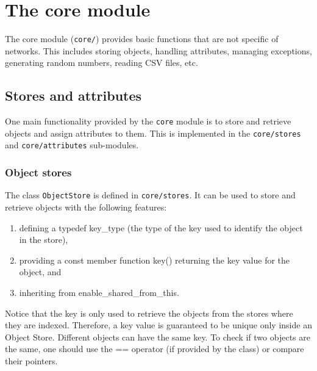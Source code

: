 \chapter{The core module}

The core module (\texttt{core/}) provides basic functions that are not specific of networks. This includes storing objects, handling attributes, managing exceptions, generating random numbers, reading CSV files, etc.

\section{Stores and attributes}

One main functionality provided by the \texttt{core} module is to store and retrieve objects and assign attributes to them. This is implemented in the \texttt{core/stores} and \texttt{core/attributes} sub-modules.

\subsection{Object stores}

The class \texttt{ObjectStore} is defined in \texttt{core/stores}. It can be used to store and retrieve objects with the following features:
\begin{enumerate}
\item defining a typedef key\_type (the type of the key used to identify the object in the store),
\item providing a const member function key() returning the key value for the object, and
\item inheriting from enable\_shared\_from\_this.
\end{enumerate}
Notice that the key is only used to retrieve the objects from the stores where they are indexed. Therefore, a key value is guaranteed to be unique only inside an Object Store. Different objects can have the same key. To check if two objects are the same, one should use the == operator (if provided by the class) or compare their pointers.

